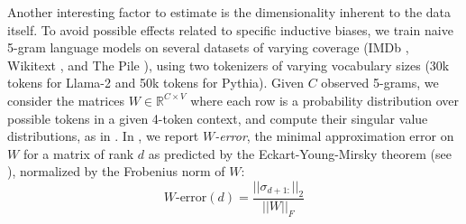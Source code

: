 Another interesting factor to estimate is the dimensionality inherent to the data itself. To avoid possible effects related to specific inductive biases, we train naive 5-gram language models on several datasets of varying coverage (IMDb \citep{imdb}, Wikitext \citep{wikitext}, and The Pile \citep{gao2020pile}), using two tokenizers of varying vocabulary sizes (30k tokens for Llama-2 and 50k tokens for Pythia). Given $C$ observed 5-grams, we consider the matrices $W \in \mathbb{R}^{C \times V}$ where each row is a probability distribution over possible tokens in a given 4-token context, and compute their singular value distributions, as in \citet{ngram_svd}. In , we report \textit{$W$-error}, the minimal approximation error on $W$ for a matrix of rank $d$ as predicted by the Eckart-Young-Mirsky theorem (see ), normalized by the Frobenius norm of $W$:
$$
W\text{-error}(d) = \frac{||\sigma_{d+1:}||_2}{||W||_F}
$$
